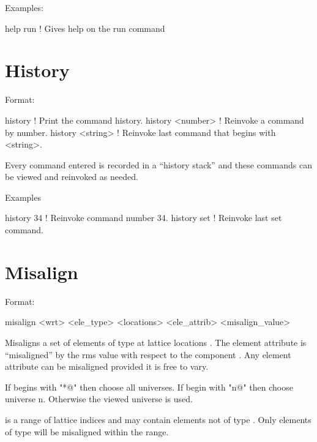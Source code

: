 Examples:
\begin{example}
  help run   ! Gives help on the run command
\end{example}

\section{History}
\label{s:history}

Format:
\begin{example}
  history           ! Print the command history.
  history <number>  ! Reinvoke a command by number.
  history <string>  ! Reinvoke last command that begins with <string>.
\end{example}

\vskip 0.2in
Every \tao command entered is recorded in a ``history stack'' and
these commands can be viewed and reinvoked as needed. 

Examples
\begin{example}
  history 34   ! Reinvoke command number 34.
  history set  ! Reinvoke last set command.  
\end{example}

\section{Misalign}
\label{s:misalign}

Format:
\begin{example}
   misalign <wrt> <ele_type> <locations> <ele_attrib> <misalign_value>
\end{example}

\vskip 0.2in
Misaligns a set of elements of type  at lattice locations .
The element attribute  is ``misaligned'' by the rms value
 with respect to the component . Any element
attribute can be misaligned provided it is free to vary.

If  begins with "*@" then choose all universes. If 
begin with "n@" then choose universe n. Otherwise the viewed universe is used.

 is a range of lattice indices and may contain elements not of
type . Only elements of type  will be misaligned
within the range.

